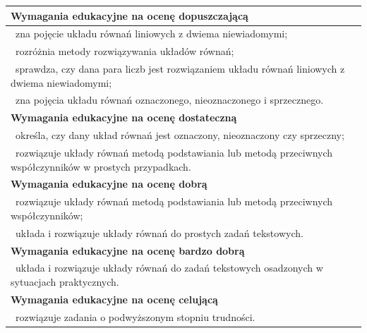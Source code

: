 \documentclass[12pt,a4paper]{article}
\begin{document}
	\begin{longtable}{|p{16cm}|}
		\hline
		
		\textbf{Wymagania edukacyjne na ocenę dopuszczającą} \\ \hline
		
		\textbullet\ zna pojęcie układu równań liniowych z dwiema niewiadomymi; \\
		
		\textbullet\ rozróżnia metody rozwiązywania układów równań; \\
		
		\textbullet\ sprawdza, czy dana para liczb jest rozwiązaniem układu równań liniowych z dwiema niewiadomymi; \\
		
		\textbullet\ zna pojęcia układu równań oznaczonego, nieoznaczonego i sprzecznego. \\ \hline
		
		\textbf{Wymagania edukacyjne na ocenę dostateczną} \\ \hline
		
		\textbullet\ określa, czy dany układ równań jest oznaczony, nieoznaczony czy sprzeczny; \\
		
		\textbullet\ rozwiązuje układy równań metodą podstawiania lub metodą przeciwnych współczynników w prostych przypadkach. \\ \hline
		
		\textbf{Wymagania edukacyjne na ocenę dobrą} \\ \hline
		
		\textbullet\ rozwiązuje układy równań metodą podstawiania lub metodą przeciwnych współczynników; \\
		
		\textbullet\ układa i rozwiązuje układy równań do prostych zadań tekstowych. \\ \hline
		
		\textbf{Wymagania edukacyjne na ocenę bardzo dobrą} \\ \hline
		
		\textbullet\ układa i rozwiązuje układy równań do zadań tekstowych osadzonych w sytuacjach praktycznych. \\ \hline
		
		\textbf{Wymagania edukacyjne na ocenę celującą} \\ \hline
		
		\textbullet\ rozwiązuje zadania o podwyższonym stopniu trudności. \\ \hline
		
	\end{longtable}
	
\end{document}
